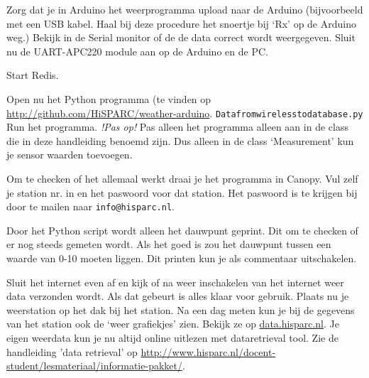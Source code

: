 Zorg dat je in Arduino het weerprogramma upload naar de Arduino
(bijvoorbeeld met een USB kabel. Haal bij deze procedure het snoertje bij `Rx' op de
Arduino weg.) Bekijk in de Serial monitor of de de data correct wordt
weergegeven. Sluit nu de UART-APC220 module aan op de Arduino en de PC.  

Start Redis.

Open nu het Python programma (te vinden op
\url{http://github.com/HiSPARC/weather-arduino}. \verb|Datafromwirelesstodatabase.py|
Run het programma. 
\emph{!Pas op!} Pas alleen het programma alleen aan in de class die in deze
handleiding benoemd zijn. Dus alleen in de class `Measurement' kun je sensor waarden 
toevoegen.

Om te checken of het allemaal werkt draai je het programma in Canopy. Vul zelf 
je \hisparc station nr. in en het paswoord voor dat station. Het paswoord is te krijgen
bij \hisparc door te mailen naar \verb|info@hisparc.nl|. 


Door het Python script wordt alleen het dauwpunt geprint. Dit om te checken
of er nog steeds gemeten wordt. Als het goed is zou het dauwpunt tussen 
een waarde van 0-10 moeten liggen. Dit printen kun je als commentaar uitschakelen.

Sluit het internet even af en kijk of na weer inschakelen van het internet weer
data verzonden wordt. Als dat gebeurt is alles klaar voor gebruik.
Plaats nu je weerstation op het dak bij het station. Na een dag meten kun je 
bij de gegevens van het station ook de `weer grafiekjes' zien. Bekijk ze op
\url{data.hisparc.nl}.
Je eigen weerdata kun je nu altijd online uitlezen met dataretrieval tool. Zie de handleiding
'data retrieval' op \url{http://www.hisparc.nl/docent-student/lesmateriaal/informatie-pakket/}.






